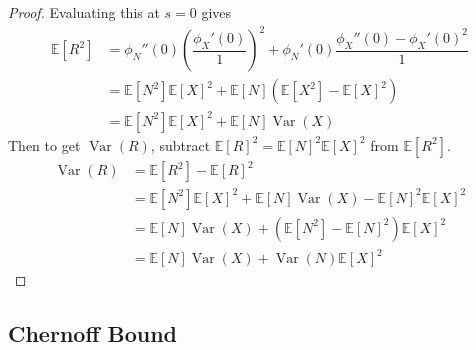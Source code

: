 \documentclass[11pt]{report} %
\begin{document}
\begin{proof}
Evaluating this at $s = 0$ gives
\begin{align}
\mathbb{E}\left[R^{2}\right] &= \phi_{N}''\left(0\right)\left(\dfrac{\phi_{X}'\left(0\right)}{1}\right)^{2}+\phi_{N}'\left(0\right)\dfrac{\phi_{X}''\left(0\right)-\phi_{X}'\left(0\right)^{2}}{1} \\
&= \mathbb{E}\left[N^{2}\right]\mathbb{E}\left[X\right]^{2}+\mathbb{E}\left[N\right]\left(\mathbb{E}\left[X^{2}\right]-\mathbb{E}\left[X\right]^{2}\right) \\
&= \mathbb{E}\left[N^{2}\right]\mathbb{E}\left[X\right]^{2}+\mathbb{E}\left[N\right]\operatorname{Var}\left(X\right)
\end{align}
Then to get $\operatorname{Var}\left(R\right)$, subtract $\mathbb{E}\left[R\right]^{2} = \mathbb{E}\left[N\right]^{2}\mathbb{E}\left[X\right]^{2}$ from $\mathbb{E}\left[R^{2}\right]$.
\begin{align}
\operatorname{Var}\left(R\right) &= \mathbb{E}\left[R^{2}\right] - \mathbb{E}\left[R\right]^{2} \\
&= \mathbb{E}\left[N^{2}\right]\mathbb{E}\left[X\right]^{2}+\mathbb{E}\left[N\right]\operatorname{Var}\left(X\right) - \mathbb{E}\left[N\right]^{2}\mathbb{E}\left[X\right]^{2} \\
&= \mathbb{E}\left[N\right]\operatorname{Var}\left(X\right) + \left(\mathbb{E}\left[N^{2}\right] - \mathbb{E}\left[N\right]^{2}\right)\mathbb{E}\left[X\right]^{2} \\
&= \mathbb{E}\left[N\right]\operatorname{Var}\left(X\right) + \operatorname{Var}\left(N\right)\mathbb{E}\left[X\right]^{2}
\end{align}
\end{proof}

\subsection{Chernoff Bound}
\end{document}
